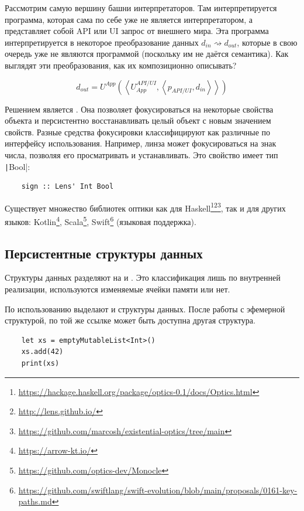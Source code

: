 
Рассмотрим самую вершину башни интерпретаторов.
Там интерпретируется программа, которая сама по себе уже не является интерпретатором, а представляет собой API или UI запрос от внешнего мира.
Эта программа интерпретируется в некоторое преобразование данных $d_{in}\rightsquigarrow d_{out}$, которые в свою очередь уже не являются программой (поскольку им не даётся семантика).
Как выглядят эти преобразования, как их композиционно описывать?

\[
    d_{out} =
    U^{App}\left(
    \left<
    U_{App}^{API/UI},
    \left<
    p_{API/UI},
    d_{in}
    \right>
    \right>
    \right)
\]


Решением является .
Она позволяет фокусироваться на некоторые свойства объекта и персистентно восстанавливать целый объект с новым значением свойств.
Разные средства фокусировки классифицируют как различные  по интерфейсу использования.
Например, линза может фокусироваться на знак числа, позволяя его просматривать и устанавливать.
Это свойство имеет тип \texttt|Bool|:
\begin{verbatim}
    sign :: Lens' Int Bool
\end{verbatim}

Существует множество библиотек оптики как для Haskell\footnote{\url{https://hackage.haskell.org/package/optics-0.1/docs/Optics.html}}\footnote{\url{http://lens.github.io/}}\footnote{\url{https://github.com/marcosh/existential-optics/tree/main}}, так и для других языков: Kotlin\footnote{\url{https://arrow-kt.io/}}, Scala\footnote{\url{https://github.com/optics-dev/Monocle}}, Swift\footnote{\url{https://github.com/swiftlang/swift-evolution/blob/main/proposals/0161-key-paths.md}} (языковая поддержка).

\subsection{Персистентные структуры данных}

Структуры данных разделяют на  и .
Это классификация лишь по внутренней реализации, используются изменяемые ячейки памяти или нет.

По использованию выделают  и  структуры данных.
После работы с эфемерной структурой, по той же ссылке может быть доступна другая структура.
\begin{verbatim}
    let xs = emptyMutableList<Int>()
    xs.add(42)
    print(xs)
\end{verbatim}


